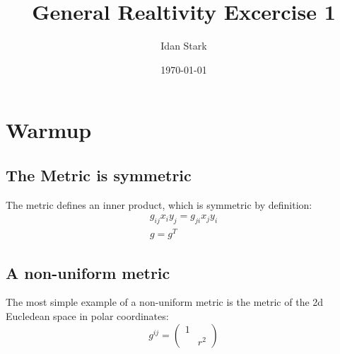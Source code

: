 \documentclass{article}
\title{General Realtivity Excercise 1}
\author{Idan Stark}
\date{\today}
\begin{document}
\maketitle
\section{Warmup}
\subsection{The Metric is symmetric}
The metric defines an inner product, which is symmetric by definition:
\begin{equation}
\begin{gathered}
    g_{ij} x_i y_j = g_{ji} x_j y_i \\
    g = g^T
\end{gathered}
\end{equation}
\subsection{A non-uniform metric}
The most simple example of a non-uniform metric is the metric of the 2d Eucledean space in polar coordinates:
\begin{equation}
    g^{ij} = \begin{pmatrix}1 & \\ & r^2\end{pmatrix}
\end{equation}
\end{document}
